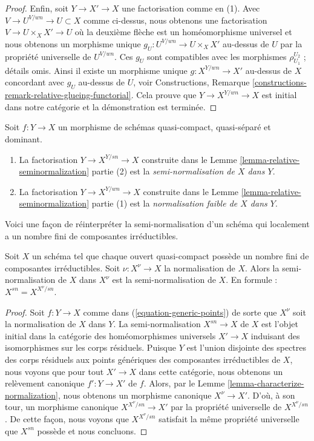 \begin{proof}
\medskip\noindent
Enfin, soit $Y \to X' \to X$ une factorisation comme en (1).
Avec $V \to U^{V/wn} \to U \subset X$ comme ci-dessus, nous obtenons
une factorisation $V \to U \times_X X' \to U$ où la deuxième flèche
est un homéomorphisme universel et nous obtenons
un morphisme unique $g_U : U^{V/wn} \to U \times_X X'$ au-dessus de $U$ par la propriété
universelle de $U^{V/wn}$. Ces
$g_U$ sont compatibles avec les morphismes $\rho_{U_1}^{U_2}$ ; détails
omis. Ainsi il existe un morphisme unique $g : X^{Y/wn} \to X'$ au-dessus
de $X$ concordant avec $g_U$
au-dessus de $U$, voir Constructions, Remarque \ref{constructions-remark-relative-glueing-functorial}.
Cela prouve que $Y \to X^{Y/wn} \to X$ est initial dans notre catégorie
et la démonstration est terminée.
\end{proof}

\begin{definition}
\label{definition-relative-seminormalization}
Soit $f : Y \to X$ un morphisme de schémas quasi-compact, quasi-séparé
et dominant.
\begin{enumerate}
\item La factorisation $Y \to X^{Y/sn} \to X$ construite dans le Lemme \ref{lemma-relative-seminormalization}
partie (2) est la {\it semi-normalisation
de $X$ dans $Y$}.
\item La factorisation $Y \to X^{Y/wn} \to X$ construite dans le Lemme \ref{lemma-relative-seminormalization}
partie (1) est la {\it normalisation
faible de $X$ dans $Y$}.
\end{enumerate}
\end{definition}

\noindent
Voici une façon de réinterpréter la semi-normalisation d'un schéma qui
localement a un nombre fini de composantes irréductibles.

\begin{lemma}
\label{lemma-seminormal-and-normalization}
Soit $X$ un schéma tel que chaque ouvert quasi-compact possède
un nombre fini de composantes irréductibles. Soit $\nu : X^\nu \to X$
la normalisation de $X$. Alors la semi-normalisation de $X$
dans $X^\nu$ est la semi-normalisation de $X$.
En formule : $X^{sn} = X^{X^\nu/sn}$.
\end{lemma}

\begin{proof}
Soit $f : Y \to X$ comme dans (\ref{equation-generic-points}) de sorte que $X^\nu$
soit la normalisation de $X$ dans $Y$.
La semi-normalisation $X^{sn} \to X$ de $X$ est l'objet initial dans la catégorie
des homéomorphismes universels $X' \to X$ induisant des isomorphismes
sur les corps résiduels. Puisque $Y$ est l'union disjointe des spectres
des corps résiduels aux points génériques des composantes irréductibles
de $X$, nous voyons que pour tout $X' \to X$ dans cette catégorie,
nous obtenons un relèvement canonique
$f' : Y \to X'$ de $f$. Alors, par le Lemme
\ref{lemma-characterize-normalization}, nous obtenons un morphisme canonique
$X^\nu \to X'$. D'où, à son tour, un morphisme canonique $X^{X^\nu/sn} \to X'$
par la propriété universelle de $X^{X^\nu/sn}$.
De cette façon, nous voyons que $X^{X^\nu/sn}$ satisfait la même
propriété universelle que $X^{sn}$ possède et nous concluons.
\end{proof}

